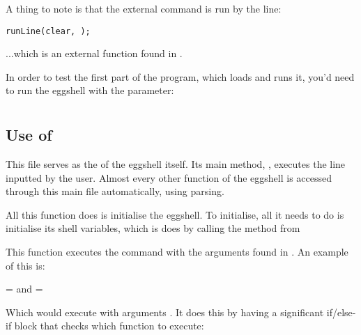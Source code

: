 \documentclass[12pt, a4paper]{report}
\begin{document}
                A thing to note is that the external command  is run by the line:

                \texttt{runLine(\quot clear\quot, \quot\quot);}

                ...which is an external function found in .

                 In order to test the first part of the program,
                which loads  and runs it, you'd need to run
                the eggshell with the  parameter: 

                \clearpage


        \clearpage

        \section{}
            \subsection{Use of }
                This file serves as the  of the eggshell itself.
                Its main method, , executes the line inputted
                by the user. Almost every other function of the eggshell is
                accessed through this main file automatically, using parsing.

                All this function does is initialise the eggshell. To initialise,
                all it needs to do is initialise its shell variables, which is 
                does by calling the method  from

                This function executes the command  with the
                arguments found in . An example of this is:

                 =  and  = 

                Which would execute  with arguments . It does this
                by having a significant if/else-if block that checks which function to execute:
\end{document}
